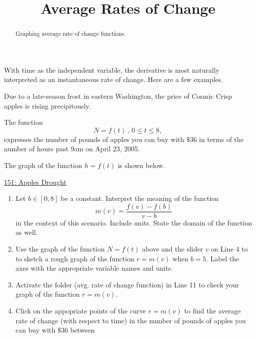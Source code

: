 \documentclass{ximera}
\title{Average Rates of Change}
\begin{document}
\begin{abstract}
Graphing average rate of change functions.
\end{abstract}
\maketitle


With time as the independent variable, the derivative is most naturally interpreted as an instantaneous rate of change. Here are a few examples. %

\begin{question}  \label{Q4ghg5df5yhhfg4tr4}
Due to a late-season frost in eastern Washington, the price of Cosmic Crisp apples is rising precipitously.

The function
\[
      N = f(t)  \, , \, 0\leq t \leq 8 ,                     %
\]
expresses the number of pounds of apples you can buy with $\$36$ in terms of the number of hours past 9am on April 23, 2005. 

The graph of the function $h=f(t)$ is shown below.

\begin{onlineOnly}
    \begin{center}
\end{center}
\end{onlineOnly}

\href{https://www.desmos.com/calculator/v561oux7cn}{151: Apples Drought}

\begin{enumerate}

\item Let $b\in [0,8]$ be a constant. Interpret the meaning of the function
\[
   m(v) =  \frac{f(v)-f(b)}{v-b}
\]
in the context of this scenario. Include units. State the domain of the function as well.

\item Use the graph of the function $N=f(t)$ above and the slider $v$ on Line 4 to to sketch a rough graph of the function $r=m(v)$ when $b=5$. Label the axes with the appropriate variable names and units.

\item Activate the folder (avg. rate of change function) in Line 11 to check your graph of the function $r=m(v)$. 

\item Click on the appopriate points of the curve $r=m(v)$ to find the average rate of change (with respect to time) in the number of pounds of apples you can buy with $\$36$ between 


\end{enumerate}
\end{question}
\end{document}
